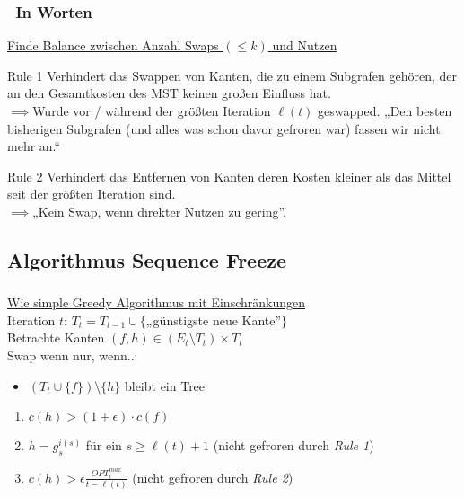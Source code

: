 \begin{frame}
    \frametitle{\insertsubsection~In Worten}
    \underline{Finde Balance zwischen Anzahl Swaps $(\leq k)$ und Nutzen}\\
    \vspace{1em}
    \begin{block}{Rule 1}
        Verhindert das Swappen von Kanten, die zu einem Subgrafen gehören, der an den Gesamtkosten des MST keinen großen Einfluss hat.\\
        $\implies$Wurde vor / während der größten Iteration $\ell(t)$ geswapped. „Den besten bisherigen Subgrafen (und alles was schon davor gefroren war) fassen wir nicht mehr an.“
    \end{block}
    \vspace{1em}
    \begin{block}{Rule 2}
        Verhindert das Entfernen von Kanten deren Kosten kleiner als das Mittel seit der größten Iteration sind.\\
        $\implies$„Kein Swap, wenn direkter Nutzen zu gering”.
    \end{block}
\end{frame}


\subsection{Algorithmus Sequence Freeze}
\begin{frame}
    \frametitle{\insertsubsection}
    \underline{Wie simple Greedy Algorithmus mit Einschränkungen}\\
    \vspace{1em}
    Iteration $t$: $T_t = T_{t-1} \cup \{$„günstigste neue Kante”$\}$\\
    \vspace{1em}
    Betrachte Kanten $(f, h) \in (E_t \setminus T_t) \times T_t$\\
    Swap wenn nur, wenn..:
    \vspace{1em}
    \begin{itemize}
        \itemsep\setlength{1em}
        \item $(T_t \cup \{f\}) \setminus \{h\}$ bleibt ein Tree
    \end{itemize}
    \begin{enumerate}
        \itemsep\setlength{1em}
        \item $c(h) > (1+\epsilon) \cdot c(f)$
        \item $h = g_s^{i(s)}$ für ein $s \geq \ell(t) + 1$ (nicht gefroren durch \emph{Rule 1})
        \item $c(h) > \epsilon\frac{OPT_t^{max}}{t-\ell(t)}$ (nicht gefroren durch \emph{Rule 2})
    \end{enumerate}
\end{frame}

